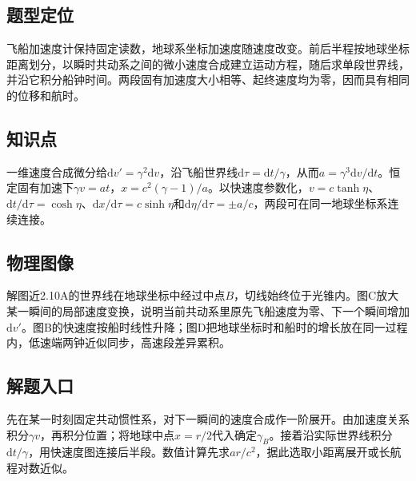 \documentclass[UTF8,fontset=fandol,a4paper,11pt]{ctexart}
\begin{document}

\subsection*{题型定位}

飞船加速度计保持固定读数，地球系坐标加速度随速度改变。前后半程按地球坐标距离划分，以瞬时共动系之间的微小速度合成建立运动方程，随后求单段世界线，并沿它积分船钟时间。两段固有加速度大小相等、起终速度均为零，因而具有相同的位移和航时。



\subsection*{知识点}

一维速度合成微分给$\mathrm dv'=\gamma^2\mathrm dv$，沿飞船世界线$\mathrm d\tau=\mathrm dt/\gamma$，从而$a=\gamma^3\mathrm dv/\mathrm dt$。恒定固有加速下$\gamma v=at$，$x=c^2(\gamma-1)/a$。以快速度参数化，$v=c\tanh\eta$、$\mathrm dt/\mathrm d\tau=\cosh\eta$、$\mathrm dx/\mathrm d\tau=c\sinh\eta$和$\mathrm d\eta/\mathrm d\tau=\pm a/c$，两段可在同一地球坐标系连续连接。



\subsection*{物理图像}

解图近2.10A的世界线在地球坐标中经过中点$B$，切线始终位于光锥内。图C放大某一瞬间的局部速度变换，说明当前共动系里原先飞船速度为零、下一个瞬间增加$\mathrm dv'$。图B的快速度按船时线性升降；图D把地球坐标时和船时的增长放在同一过程内，低速端两钟近似同步，高速段差异累积。



\subsection*{解题入口}

先在某一时刻固定共动惯性系，对下一瞬间的速度合成作一阶展开。由加速度关系积分$\gamma v$，再积分位置；将地球中点$x=r/2$代入确定$\gamma_B$。接着沿实际世界线积分$\mathrm dt/\gamma$，用快速度图连接后半段。数值计算先求$ar/c^2$，据此选取小距离展开或长航程对数近似。
\end{document}
